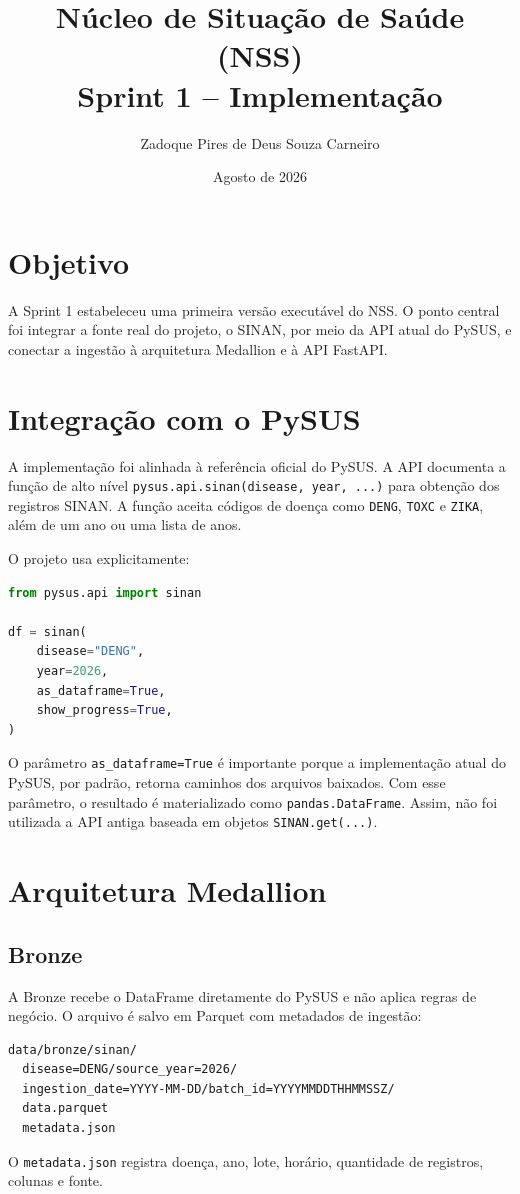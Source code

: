 \documentclass[12pt,a4paper]{article}
\title{Núcleo de Situação de Saúde (NSS)\\Sprint 1 -- Implementação}
\author{Zadoque Pires de Deus Souza Carneiro}
\date{Agosto de 2026}
\begin{document}
\maketitle

\section{Objetivo}
A Sprint 1 estabeleceu uma primeira versão executável do NSS. O ponto central foi integrar a fonte real do projeto, o SINAN, por meio da API atual do PySUS, e conectar a ingestão à arquitetura Medallion e à API FastAPI.

\section{Integração com o PySUS}
A implementação foi alinhada à referência oficial do PySUS. A API documenta a função de alto nível \texttt{pysus.api.sinan(disease, year, ...)} para obtenção dos registros SINAN. A função aceita códigos de doença como \texttt{DENG}, \texttt{TOXC} e \texttt{ZIKA}, além de um ano ou uma lista de anos.

O projeto usa explicitamente:
\begin{lstlisting}[language=Python]
from pysus.api import sinan

df = sinan(
    disease="DENG",
    year=2026,
    as_dataframe=True,
    show_progress=True,
)
\end{lstlisting}

O parâmetro \texttt{as\_dataframe=True} é importante porque a implementação atual do PySUS, por padrão, retorna caminhos dos arquivos baixados. Com esse parâmetro, o resultado é materializado como \texttt{pandas.DataFrame}. Assim, não foi utilizada a API antiga baseada em objetos \texttt{SINAN.get(...)}.

\section{Arquitetura Medallion}

\subsection{Bronze}
A Bronze recebe o DataFrame diretamente do PySUS e não aplica regras de negócio. O arquivo é salvo em Parquet com metadados de ingestão:
\begin{verbatim}
data/bronze/sinan/
  disease=DENG/source_year=2026/
  ingestion_date=YYYY-MM-DD/batch_id=YYYYMMDDTHHMMSSZ/
  data.parquet
  metadata.json
\end{verbatim}
O \texttt{metadata.json} registra doença, ano, lote, horário, quantidade de registros, colunas e fonte.
\end{document}
